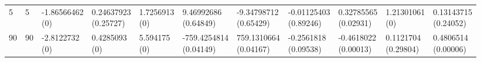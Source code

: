 \documentclass[12pt,a4paper,twoside,openany]{book}
\begin{document}
\begin{table}[ht]
{\begin{tabular}{lllllllllll}
  5 & 5 & \makecell{-1.86566462 \\ (0)} & \makecell{0.24637923 \\ (0.25727)} & \makecell{1.7256913 \\ (0)} & \makecell{9.46992686 \\ (0.64849)} & \makecell{-9.34798712 \\ (0.65429)} & \makecell{-0.01125403 \\ (0.89246)} & \makecell{0.32785565 \\ (0.02931)} & \makecell{1.21301061 \\ (0)} & \makecell{0.13143715 \\ (0.24052)} \\ 
  90 & 90 & \makecell{-2.8122732 \\ (0)} & \makecell{0.4285093 \\ (0)} & \makecell{5.594175 \\ (0)} & \makecell{-759.4254814 \\ (0.04149)} & \makecell{759.1310664 \\ (0.04167)} & \makecell{-0.2561818 \\ (0.09538)} & \makecell{-0.4618022 \\ (0.00013)} & \makecell{0.1121704 \\ (0.29804)} & \makecell{0.4806514 \\ (0.00006)} \\ 
   \hline
\end{tabular}}
\end{table}
\end{document}
